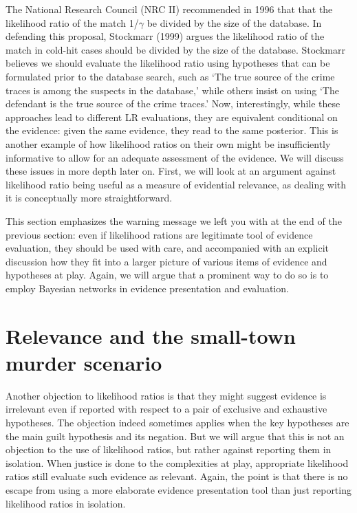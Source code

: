 \documentclass[
  10pt,
  dvipsnames,enabledeprecatedfontcommands]{scrartcl}
\begin{document}
The National Research Council (NRC II) recommended in 1996 that that the
likelihood ratio of the match 1/\(\gamma\) be divided by the size of the
database. In defending this proposal, Stockmarr (1999) argues the
likelihood ratio of the match in cold-hit cases should be divided by the
size of the database. Stockmarr believes we should evaluate the
likelihood ratio using hypotheses that can be formulated prior to the
database search, such as `The true source of the crime traces is among
the suspects in the database,' while others insist on using `The
defendant is the true source of the crime traces.' Now, interestingly,
while these approaches lead to different LR evaluations, they are
equivalent conditional on the evidence: given the same evidence, they
read to the same posterior. This is another example of how likelihood
ratios on their own might be insufficiently informative to allow for an
adequate assessment of the evidence. We will discuss these issues in
more depth later on. First, we will look at an argument against
likelihood ratio being useful as a measure of evidential relevance, as
dealing with it is conceptually more straightforward.

This section emphasizes the warning message we left you with at the end
of the previous section: even if likelihood rations are legitimate tool
of evidence evaluation, they should be used with care, and accompanied
with an explicit discussion how they fit into a larger picture of
various items of evidence and hypotheses at play. Again, we will argue
that a prominent way to do so is to employ Bayesian networks in evidence
presentation and evaluation.

\hypertarget{relevance-and-the-small-town-murder-scenario}{%
\section{\texorpdfstring{Relevance and the small-town murder scenario
\label{sec:relevance}}{Relevance and the small-town murder scenario }}\label{relevance-and-the-small-town-murder-scenario}}

Another objection to likelihood ratios is that they might suggest
evidence is irrelevant even if reported with respect to a pair of
exclusive and exhaustive hypotheses. The objection indeed sometimes
applies when the key hypotheses are the main guilt hypothesis and its
negation. But we will argue that this is not an objection to the use of
likelihood ratios, but rather against reporting them in isolation. When
justice is done to the complexities at play, appropriate likelihood
ratios still evaluate such evidence as relevant. Again, the point is
that there is no escape from using a more elaborate evidence
presentation tool than just reporting likelihood ratios in isolation.
\end{document}
